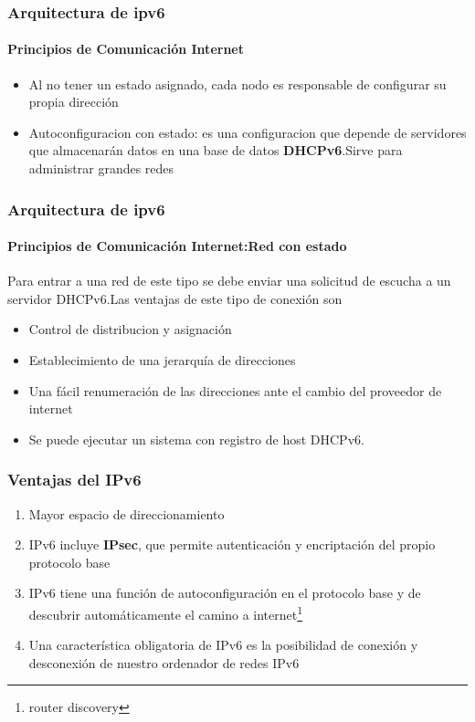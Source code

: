 \documentclass{beamer}
\begin{document}
\begin{frame}
\frametitle{Arquitectura de ipv6}
 \framesubtitle{\large{\vspace*{0,3cm}Principios de Comunicación\textbf{ Internet} \textbf{}}}
  \begin{itemize}
	\item Al no tener un estado asignado, cada nodo es responsable de configurar su propia dirección
	\item Autoconfiguracion con estado: es  una configuracion que depende de servidores que almacenarán datos en 		una base de datos \textbf{DHCPv6}.Sirve para administrar grandes redes

\end{itemize}
\end{frame}

\begin{frame}
\frametitle{Arquitectura de ipv6}
\framesubtitle{\large{\vspace*{0,3cm}Principios de Comunicación Internet:\textbf{Red con estado}}}

Para entrar a una red de este tipo se debe enviar una solicitud de escucha a un servidor DHCPv6.Las ventajas de este tipo de conexión son
\begin{itemize}
	\item Control de distribucion y asignación
	\item Establecimiento de una jerarquía de direcciones
	\item Una fácil renumeración de las direcciones ante el cambio del proveedor de internet
	\item Se puede ejecutar un sistema con registro de host DHCPv6.
\end{itemize}
\end{frame}

\begin{frame}
\frametitle{Ventajas del IPv6}

\begin{enumerate}[$*$]

	\item Mayor espacio de direccionamiento
	\item IPv6  incluye \textbf{IPsec}, que permite autenticación y encriptación del propio protocolo base
	\item IPv6 tiene una función de autoconfiguración en el protocolo base y de descubrir automáticamente el camino a internet\footnote{router discovery}
	\item Una característica obligatoria de IPv6 es la posibilidad de conexión y desconexión de nuestro ordenador de redes IPv6
\end{enumerate}
\end{frame}
\end{document}
